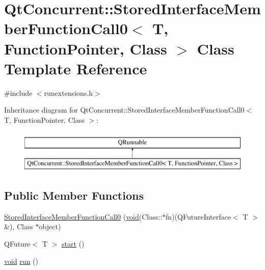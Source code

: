 \hypertarget{class_qt_concurrent_1_1_stored_interface_member_function_call0}{\section{Qt\-Concurrent\-:\-:Stored\-Interface\-Member\-Function\-Call0$<$ T, Function\-Pointer, Class $>$ Class Template Reference}
\label{class_qt_concurrent_1_1_stored_interface_member_function_call0}
}


{\ttfamily \#include $<$runextensions.\-h$>$}

Inheritance diagram for Qt\-Concurrent\-:\-:Stored\-Interface\-Member\-Function\-Call0$<$ T, Function\-Pointer, Class $>$\-:\begin{figure}[H]
\begin{center}
\leavevmode
\includegraphics[height=2.000000cm]{class_qt_concurrent_1_1_stored_interface_member_function_call0}
\end{center}
\end{figure}
\subsection*{Public Member Functions}
\begin{DoxyCompactItemize}
\item 
\hyperlink{class_qt_concurrent_1_1_stored_interface_member_function_call0_a318534c7b82ac4bb7f5f6e4b3dec6855}{Stored\-Interface\-Member\-Function\-Call0} (\hyperlink{group___u_a_v_objects_plugin_ga444cf2ff3f0ecbe028adce838d373f5c}{void}(Class\-::$\ast$fn)(Q\-Future\-Interface$<$ T $>$ \&), Class $\ast$object)
\item 
Q\-Future$<$ T $>$ \hyperlink{class_qt_concurrent_1_1_stored_interface_member_function_call0_a1bcda6c339be56bbafd3237610bcd43a}{start} ()
\item 
\hyperlink{group___u_a_v_objects_plugin_ga444cf2ff3f0ecbe028adce838d373f5c}{void} \hyperlink{class_qt_concurrent_1_1_stored_interface_member_function_call0_a73dd6986a46d6015436694695eeb50b4}{run} ()
\end{DoxyCompactItemize}


